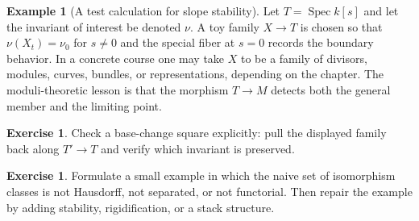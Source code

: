 \documentclass[11pt]{amsart}
\theoremstyle{definition}
\newtheorem{example}[theorem]{Example}
\newtheorem{exercise}[theorem]{Exercise}
\newcommand{\Spec}{\operatorname{Spec}}
\begin{document}
\begin{example}[A test calculation for slope stability]
Let $T=\Spec k[s]$ and let the invariant of interest be denoted $\nu$.  A toy family $X\to T$ is chosen so that $\nu(X_t)=\nu_0$ for $s\ne0$ and the special fiber at $s=0$ records the boundary behavior.  In a concrete course one may take $X$ to be a family of divisors, modules, curves, bundles, or representations, depending on the chapter.  The moduli-theoretic lesson is that the morphism $T\to M$ detects both the general member and the limiting point.
\end{example}
\begin{exercise}
Check a base-change square explicitly: pull the displayed family back along $T\prime\to T$ and verify which invariant is preserved.
\end{exercise}
\begin{exercise}
Formulate a small example in which the naive set of isomorphism classes is not Hausdorff, not separated, or not functorial.  Then repair the example by adding stability, rigidification, or a stack structure.
\end{exercise}
\clearpage
\end{document}
